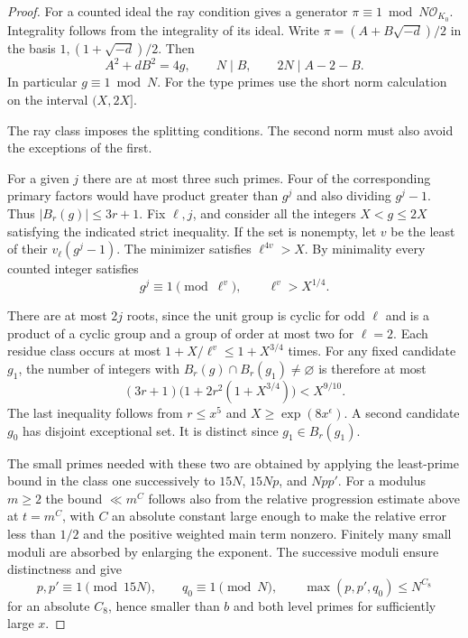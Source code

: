 \begin{proof}
For a counted ideal the ray condition gives a generator
\(\pi\equiv1\bmod N\mathcal O_{K_0}\). Integrality follows
from the integrality of its ideal. Write
\(\pi=(A+B\sqrt{-d})/2\) in the basis
\(1,(1+\sqrt{-d})/2\). Then
\[
 A^2+dB^2=4g,\qquad N\mid B,\qquad 2N\mid A-2-B .
\] In particular
\(g\equiv1\bmod N\). For the type primes use the short norm calculation on the interval \((X,2X]\).

The ray class imposes the splitting conditions. The second norm must also avoid the exceptions of the first.

For a given \(j\) there are at most three such primes. Four of
the corresponding primary factors would have product greater
than \(g^j\) and also dividing \(g^j-1\). Thus
\(|B_r(g)|\le3r+1\). Fix \(\ell,j\), and consider all the
integers \(X<g\le2X\) satisfying the indicated strict inequality.
If the set is nonempty, let \(v\) be the least of their
\(v_\ell(g^j-1)\). The minimizer satisfies \(\ell^{4v}>X\). By minimality every counted integer satisfies
\[
 g^j\equiv1\pmod{\ell^v},\qquad \ell^v>X^{1/4}.
\]

There are at most \(2j\) roots, since the unit group is cyclic
for odd \(\ell\) and is a product of a cyclic group and a
group of order at most two for \(\ell=2\).
Each residue class occurs at most \(1+X/\ell^v\le1+X^{3/4}\)
times. For any fixed candidate \(g_1\), the number of integers
with \(B_r(g)\cap B_r(g_1)\ne\varnothing\) is therefore at most
\[
 (3r+1)\big(1+2r^2(1+X^{3/4})\big)<X^{9/10}.
\]
The last inequality follows from \(r\le x^5\) and
\(X\ge\exp(8x^\epsilon)\). A second candidate \(g_0\) has disjoint
exceptional set. It is distinct since \(g_1\in B_r(g_1)\).

The small primes needed with these two are obtained by applying
the least-prime bound in the class one successively to \(15N\),
\(15Np\), and \(Npp'\). For a modulus \(m\ge2\) the bound
\(\ll m^{C}\) follows also from the relative progression estimate
above at \(t=m^C\), with \(C\) an absolute constant large enough
to make the relative error less than \(1/2\) and the positive
weighted main term nonzero. Finitely many small moduli are
absorbed by enlarging the exponent. The successive moduli ensure distinctness and give
\[
 p,p'\equiv1\pmod{15N},\qquad q_0\equiv1\pmod N,\qquad \max(p,p',q_0)\le N^{C_8}
\]
for an absolute \(C_8\), hence smaller than \(b\) and both level
primes for sufficiently large \(x\).
\end{proof}

